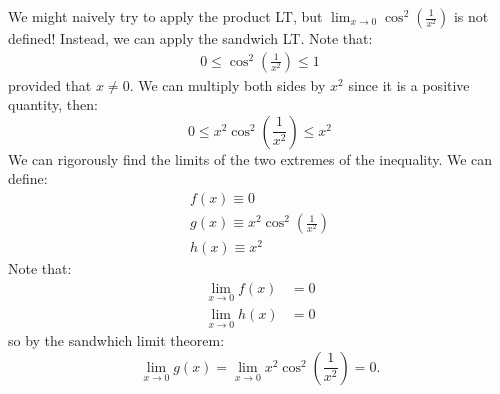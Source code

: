 \begin{itemize}
\begin{example}
        We might naively try to apply the product LT, but $\displaystyle \lim_{x\to 0}\cos^2\left(\frac{1}{x^2}\right)$ is not defined! Instead, we can apply the sandwich LT. Note that:
        \begin{align}
            0 \le \cos^2\left(\frac{1}{x^2}\right) \le 1
        \end{align}
        provided that $x\neq 0$. We can multiply both sides by $x^2$ since it is a positive quantity, then:
        \begin{equation}
            0 \le x^2\cos^2\left(\frac{1}{x^2}\right)\le x^2
            \label{eq:}
        \end{equation}
        We can rigorously find the limits of the two extremes of the inequality. We can define:
        \begin{align}
            f(x) \equiv 0 \\ 
            g(x) \equiv x^2\cos^2\left(\frac{1}{x^2}\right) \\ 
            h(x) \equiv x^2
        \end{align}
        Note that:
        \begin{align}
            \lim_{x\to 0}f(x)&=0 \\ 
            \lim_{x\to 0}h(x)&=0
            \label{eq:}
        \end{align}
        so by the sandwhich limit theorem:
        \begin{equation}
            \lim_{x\to 0} g(x) = \lim_{x\to 0} x^2\cos^2\left(\frac{1}{x^2}\right)=0.
            \label{eq:}
        \end{equation}
    \end{example}
\end{itemize}